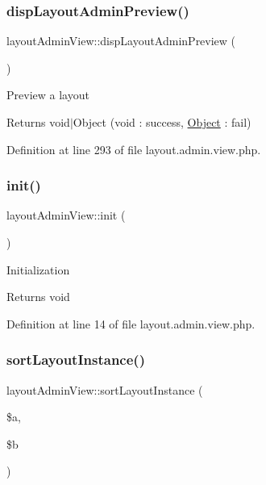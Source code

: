 \mbox{\label{classlayoutAdminView_a0c3520a579bb0bbdf1975273c3c6036c}} 
\subsubsection{\texorpdfstring{disp\+Layout\+Admin\+Preview()}{dispLayoutAdminPreview()}}
{\footnotesize\ttfamily layout\+Admin\+View\+::disp\+Layout\+Admin\+Preview (\begin{DoxyParamCaption}{ }\end{DoxyParamCaption})}

Preview a layout \begin{DoxyReturn}{Returns}
void$\vert$\+Object (void \+: success, \hyperlink{classObject}{Object} \+: fail) 
\end{DoxyReturn}


Definition at line 293 of file layout.\+admin.\+view.\+php.

\mbox{\label{classlayoutAdminView_a572826e03a68707b409298b63d438d5a}} 
\subsubsection{\texorpdfstring{init()}{init()}}
{\footnotesize\ttfamily layout\+Admin\+View\+::init (\begin{DoxyParamCaption}{ }\end{DoxyParamCaption})}

Initialization \begin{DoxyReturn}{Returns}
void 
\end{DoxyReturn}


Definition at line 14 of file layout.\+admin.\+view.\+php.

\mbox{\label{classlayoutAdminView_ae962bf1da94055c92d4fbb6a1bc66458}} 
\subsubsection{\texorpdfstring{sort\+Layout\+Instance()}{sortLayoutInstance()}}
{\footnotesize\ttfamily layout\+Admin\+View\+::sort\+Layout\+Instance (\begin{DoxyParamCaption}\item[{}]{\$a,  }\item[{}]{\$b }\end{DoxyParamCaption})}

